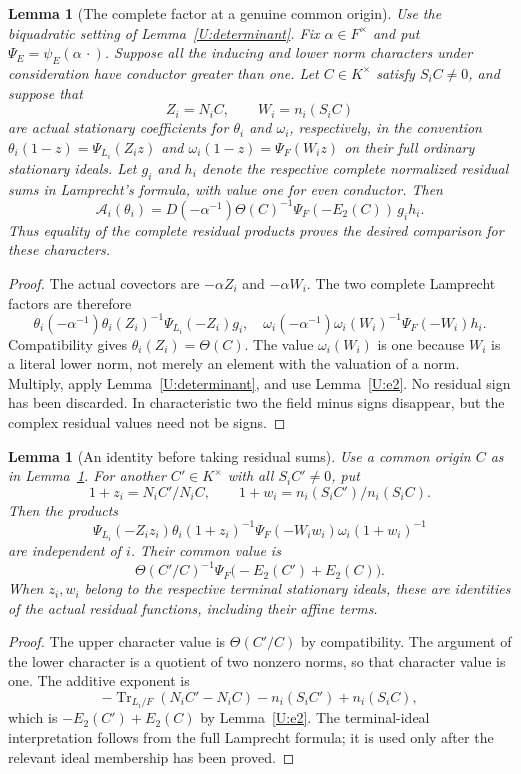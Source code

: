 \documentclass[11pt]{amsart}
\newtheorem{lemma}[theorem]{Lemma}
\theoremstyle{definition}
\theoremstyle{remark}
\newcommand{\Tr}{\operatorname{Tr}}
\begin{document}
\begin{lemma}[The complete factor at a genuine common origin]\label{U:common-origin}
Use the biquadratic setting of Lemma~\ref{U:determinant}. Fix $\alpha\in F^\times$
and put $\Psi_E=\psi_E(\alpha\,\cdot)$.
Suppose all the inducing and lower norm characters under consideration
have conductor greater than one. Let $C\in K^\times$ satisfy $S_iC\ne0$,
and suppose that
\[
 Z_i=N_iC,\qquad W_i=n_i(S_iC)
\]
are actual stationary coefficients for $\theta_i$ and $\omega_i$,
respectively, in the convention
$\theta_i(1-z)=\Psi_{L_i}(Z_i z)$ and
$\omega_i(1-z)=\Psi_F(W_i z)$ on their full ordinary stationary ideals.
Let $g_i$ and $h_i$ denote the respective complete normalized residual
sums in Lamprecht's formula, with value one for even conductor. Then
\[
 \mathcal A_i(\theta_i)
   =D(-\alpha^{-1})\Theta(C)^{-1}\Psi_F(-E_2(C))\,g_i h_i.
\]
Thus equality of the complete residual products proves the desired
comparison for these characters.
\end{lemma}
\begin{proof}
The actual covectors are $-\alpha Z_i$ and $-\alpha W_i$. The two complete
Lamprecht factors are therefore
\[
 \theta_i(-\alpha^{-1})\theta_i(Z_i)^{-1}\Psi_{L_i}(-Z_i)g_i,
 \quad
 \omega_i(-\alpha^{-1})\omega_i(W_i)^{-1}\Psi_F(-W_i)h_i.
\]
Compatibility gives $\theta_i(Z_i)=\Theta(C)$. The value
$\omega_i(W_i)$ is one because $W_i$ is a literal lower norm, not merely
an element with the valuation of a norm. Multiply, apply
Lemma~\ref{U:determinant}, and use Lemma~\ref{U:e2}.
No residual sign has been discarded. In characteristic two the field
minus signs disappear, but the complex residual values need not be signs.
\end{proof}

\begin{lemma}[An identity before taking residual sums]\label{U:common-function}
Use a common origin $C$ as in Lemma~\ref{U:common-origin}. For another
$C'\in K^\times$ with all $S_iC'\ne0$, put
\[
 1+z_i=N_iC'/N_iC,\qquad 1+w_i=n_i(S_iC')/n_i(S_iC).
\]
Then the products
\[
 \Psi_{L_i}(-Z_i z_i)\theta_i(1+z_i)^{-1}
 \Psi_F(-W_i w_i)\omega_i(1+w_i)^{-1}
\]
are independent of $i$. Their common value is
\[
 \Theta(C'/C)^{-1}\Psi_F\bigl(-E_2(C')+E_2(C)\bigr).
\]
When $z_i,w_i$ belong to the respective terminal stationary ideals,
these are identities of the actual residual functions, including their
affine terms.
\end{lemma}
\begin{proof}
The upper character value is $\Theta(C'/C)$ by compatibility.
The argument of the lower character is a quotient of two nonzero norms,
so that character value is one. The additive exponent is
\[
 -\Tr_{L_i/F}(N_iC'-N_iC)-n_i(S_iC')+n_i(S_iC),
\]
which is $-E_2(C')+E_2(C)$ by Lemma~\ref{U:e2}.
The terminal-ideal interpretation follows from the full Lamprecht formula;
it is used only after the relevant ideal membership has been proved.
\end{proof}
\end{document}
